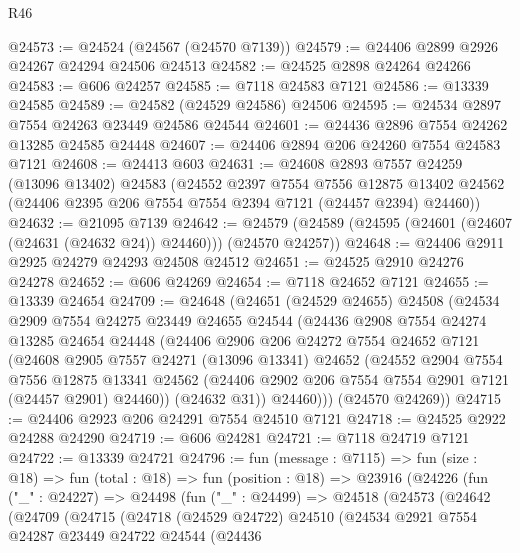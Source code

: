 \begin{lexlean}{R46}
\begin{coremodule}
@24573 := @24524 (@24567 (@24570 @7139))
@24579 := @24406 @2899 @2926 @24267 @24294 @24506 @24513
@24582 := @24525 @2898 @24264 @24266
@24583 := @606 @24257
@24585 := @7118 @24583 @7121
@24586 := @13339 @24585
@24589 := @24582 (@24529 @24586) @24506
@24595 := @24534 @2897 @7554 @24263 @23449 @24586 @24544
@24601 := @24436 @2896 @7554 @24262 @13285 @24585 @24448
@24607 := @24406 @2894 @206 @24260 @7554 @24583 @7121
@24608 := @24413 @603
@24631 := @24608
    @2893
    @7557
    @24259
    (@13096 @13402)
    @24583
    (@24552
      @2397
      @7554
      @7556
      @12875
      @13402
      @24562
      (@24406 @2395 @206 @7554 @7554 @2394 @7121 (@24457 @2394) @24460))
@24632 := @21095 @7139
@24642 := @24579 (@24589 (@24595 (@24601 (@24607 (@24631 (@24632 @24)) @24460))) (@24570 @24257))
@24648 := @24406 @2911 @2925 @24279 @24293 @24508 @24512
@24651 := @24525 @2910 @24276 @24278
@24652 := @606 @24269
@24654 := @7118 @24652 @7121
@24655 := @13339 @24654
@24709 := @24648
    (@24651
      (@24529 @24655)
      @24508
      (@24534
        @2909
        @7554
        @24275
        @23449
        @24655
        @24544
        (@24436
          @2908
          @7554
          @24274
          @13285
          @24654
          @24448
          (@24406
            @2906
            @206
            @24272
            @7554
            @24652
            @7121
            (@24608
              @2905
              @7557
              @24271
              (@13096 @13341)
              @24652
              (@24552
                @2904
                @7554
                @7556
                @12875
                @13341
                @24562
                (@24406 @2902 @206 @7554 @7554 @2901 @7121 (@24457 @2901) @24460))
              (@24632 @31))
            @24460)))
      (@24570 @24269))
@24715 := @24406 @2923 @206 @24291 @7554 @24510 @7121
@24718 := @24525 @2922 @24288 @24290
@24719 := @606 @24281
@24721 := @7118 @24719 @7121
@24722 := @13339 @24721
@24796 := fun (message : @7115) =>
  fun (size : @18) =>
  fun (total : @18) =>
  fun (position : @18) =>
  @23916
    (@24226
      (fun ("_" : @24227) =>
      @24498
        (fun ("_" : @24499) =>
        @24518
          (@24573
            (@24642
              (@24709
                (@24715
                  (@24718
                    (@24529 @24722)
                    @24510
                    (@24534
                      @2921
                      @7554
                      @24287
                      @23449
                      @24722
                      @24544
                      (@24436

\end{coremodule}
\end{lexlean}
